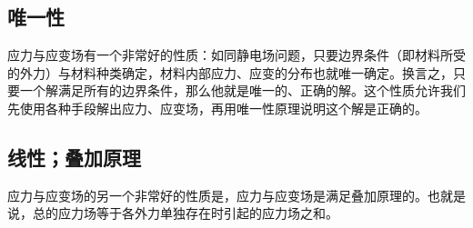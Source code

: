 
\begin{issues}
\issueDraft
\end{issues}

\subsection{唯一性}
应力与应变场有一个非常好的性质：如同静电场问题，只要边界条件（即材料所受的外力）与材料种类确定，材料内部应力、应变的分布也就唯一确定。换言之，只要一个解满足所有的边界条件，那么他就是唯一的、正确的解。这个性质允许我们先使用各种手段解出应力、应变场，再用唯一性原理说明这个解是正确的。

\subsection{线性；叠加原理}
应力与应变场的另一个非常好的性质是，应力与应变场是满足叠加原理的。也就是说，总的应力场等于各外力单独存在时引起的应力场之和。
